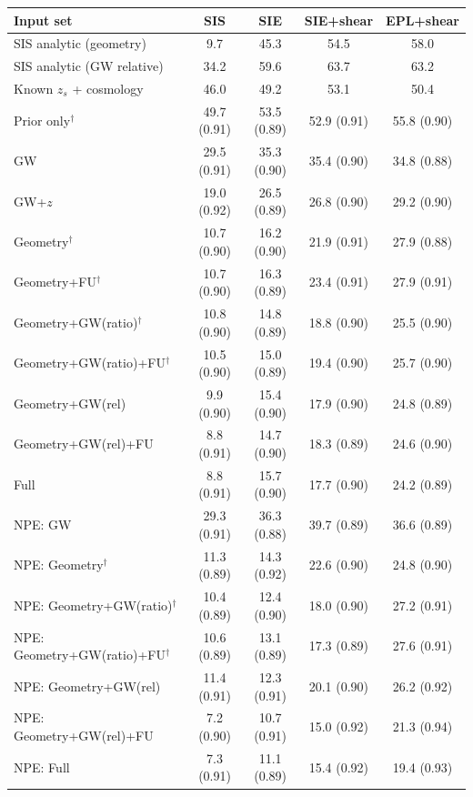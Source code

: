 \begin{tabular*}{\linewidth}{@{\extracolsep{\fill}}lcccc@{}}
\toprule
Input set & SIS & SIE & SIE+shear & EPL+shear \\
\midrule
SIS analytic (geometry) & 9.7 & 45.3 & 54.5 & 58.0 \\
SIS analytic (GW relative) & 34.2 & 59.6 & 63.7 & 63.2 \\
Known $z_s$ + cosmology & 46.0 & 49.2 & 53.1 & 50.4 \\
\midrule
Prior only$^\dagger$ & 49.7 (0.91) & 53.5 (0.89) & 52.9 (0.91) & 55.8 (0.90) \\
GW & 29.5 (0.91) & 35.3 (0.90) & 35.4 (0.90) & 34.8 (0.88) \\
GW+$z$ & 19.0 (0.92) & 26.5 (0.89) & 26.8 (0.90) & 29.2 (0.90) \\
Geometry$^\dagger$ & 10.7 (0.90) & 16.2 (0.90) & 21.9 (0.91) & 27.9 (0.88) \\
Geometry+FU$^\dagger$ & 10.7 (0.90) & 16.3 (0.89) & 23.4 (0.91) & 27.9 (0.91) \\
Geometry+GW(ratio)$^\dagger$ & 10.8 (0.90) & 14.8 (0.89) & 18.8 (0.90) & 25.5 (0.90) \\
Geometry+GW(ratio)+FU$^\dagger$ & 10.5 (0.90) & 15.0 (0.89) & 19.4 (0.90) & 25.7 (0.90) \\
Geometry+GW(rel) & 9.9 (0.90) & 15.4 (0.90) & 17.9 (0.90) & 24.8 (0.89) \\
Geometry+GW(rel)+FU & 8.8 (0.91) & 14.7 (0.90) & 18.3 (0.89) & 24.6 (0.90) \\
Full & 8.8 (0.91) & 15.7 (0.90) & 17.7 (0.90) & 24.2 (0.89) \\
\midrule
NPE: GW & 29.3 (0.91) & 36.3 (0.88) & 39.7 (0.89) & 36.6 (0.89) \\
NPE: Geometry$^\dagger$ & 11.3 (0.89) & 14.3 (0.92) & 22.6 (0.90) & 24.8 (0.90) \\
NPE: Geometry+GW(ratio)$^\dagger$ & 10.4 (0.89) & 12.4 (0.90) & 18.0 (0.90) & 27.2 (0.91) \\
NPE: Geometry+GW(ratio)+FU$^\dagger$ & 10.6 (0.89) & 13.1 (0.89) & 17.3 (0.89) & 27.6 (0.91) \\
NPE: Geometry+GW(rel) & 11.4 (0.91) & 12.3 (0.91) & 20.1 (0.90) & 26.2 (0.92) \\
NPE: Geometry+GW(rel)+FU & 7.2 (0.90) & 10.7 (0.91) & 15.0 (0.92) & 21.3 (0.94) \\
NPE: Full & 7.3 (0.91) & 11.1 (0.89) & 15.4 (0.92) & 19.4 (0.93) \\
\bottomrule
\end{tabular*}
